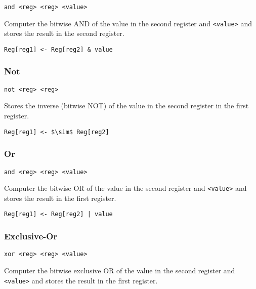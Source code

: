 \begin{lstlisting}[style=assembly]
    and <reg> <reg> <value>
\end{lstlisting}

Computer the bitwise AND of the value in the second register and \texttt{<value>} and stores the result in the second register.

\begin{lstlisting}[style=rtn,mathescape]
    Reg[reg1] <- Reg[reg2] & value
\end{lstlisting}

\subsubsection{Not}

\begin{lstlisting}[style=assembly]
    not <reg> <reg>
\end{lstlisting}

Stores the inverse (bitwise NOT) of the value in the second register in the first register.

\begin{lstlisting}[style=rtn,mathescape]
    Reg[reg1] <- $\sim$ Reg[reg2]
\end{lstlisting}

\subsubsection{Or}

\begin{lstlisting}[style=assembly]
    and <reg> <reg> <value>
\end{lstlisting}

Computer the bitwise OR of the value in the second register and \texttt{<value>} and stores the result in the first register.

\begin{lstlisting}[style=rtn,mathescape]
    Reg[reg1] <- Reg[reg2] | value
\end{lstlisting}

\subsubsection{Exclusive-Or}

\begin{lstlisting}[style=assembly]
    xor <reg> <reg> <value>
\end{lstlisting}

Computer the bitwise exclusive OR of the value in the second register and \texttt{<value>} and stores the result in the first register.

